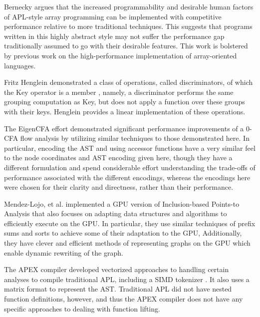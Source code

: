 \documentclass[numbers,9pt]{sigplanconf}
\begin{document}
Bernecky \cite{bernecky2015abstract} argues that the increased programmability 
and desirable human factors of APL-style array programming can be implemented 
with competitive performance relative to more traditional techniques. This 
suggests that programs written in this highly abstract style may not suffer the 
performance gap traditionally assumed to go with their desirable features. 
This work is bolstered by previous work on the high-performance implementation 
of array-oriented languages. 
\cite{ching1994experimental,ching1993primitive,
ching1990automatic,ju1991exploitation,
ju1991performance,bernecky1999reducing,schwarz1991acorn}

Fritz Henglein demonstrated a class of operations, called
discriminators, of which the Key operator is a member  
\cite{henglein2013dd}
, namely,
a discriminator performs the same grouping computation as Key, but
does not apply a function over these groups with their keys. Henglein
provides a linear implementation of these operations.

The EigenCFA effort \cite{prabhu2011eigencfa} demonstrated significant performance
improvements of a 0-CFA flow analysis by utilizing similar techniques
to those demonstrated here. In particular, encoding the AST and using
accessor functions have a very similar feel to the node coordinates and
AST encoding given here, though they have a different formulation and
spend considerable effort understanding the trade-offs of performance
associated with the different encodings, whereas the encodings here
were chosen for their clarity and directness, rather than their
performance.

Mendez-Lojo, et al. implemented a GPU version of Inclusion-based
Points-to Analysis \cite{mendez2012inclusion} that also focuses on 
adapting data structures
and algorithms to efficiently execute on the GPU. In particular,
they use similar techniques of prefix sums and sorts to achieve some
of their adaptation to the GPU, Additionally, they have clever and
efficient methods of representing graphs on the GPU which enable
dynamic rewriting of the graph.

The APEX compiler \cite{bernecky1997apex} developed vectorized approaches to handling
certain analyses to compile traditional APL, including a SIMD tokenizer
\cite{bernecky2003tokenizer}.
It also uses 
a matrix format to represent the AST. Traditional APL did not have
nested function definitions, however, and thus the APEX compiler does
not have any specific approaches to dealing with function lifting.
\end{document}
